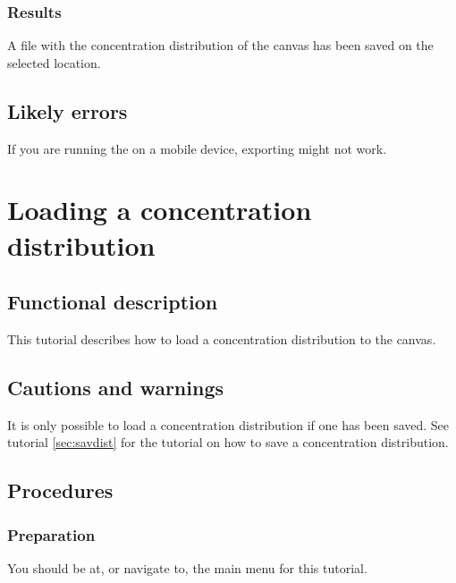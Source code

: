 \subsubsection{Results}
A file with the concentration distribution of the canvas has been saved on the selected location.

\subsection{Likely errors}
If you are running the \applicationname{} on a mobile device, exporting might not work.


\section{Loading a concentration distribution}
\label{sec:loadDist}

\subsection{Functional description}
This tutorial describes how to load a concentration distribution to the canvas.

\subsection{Cautions and warnings}
It is only possible to load a concentration distribution if one has been saved. See tutorial \ref{sec:savdist} for the tutorial on how to save a concentration distribution.

\subsection{Procedures}
\subsubsection{Preparation}
You should be at, or navigate to, the main menu for this tutorial.

